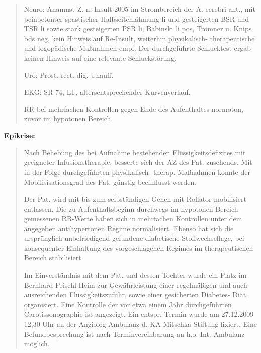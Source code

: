 {\begin{quote}
Neuro: Anamnst Z. n. Insult 2005 im Strombereich der A. cerebri ant., mit
beinbetonter spastischer Halbseitenlähmung li und gesteigerten
BSR und TSR li
sowie stark gesteigerten PSR li, Babinski li pos, Trömner u. Knips bds neg, kein Hinweis auf
Re-Insult, weiterhin physi\-ka\-lisch- thera\-peutische und logopädische
Maßnahmen empf. Der durchgeführte Schlucktest ergab keinen Hinweis auf eine relevante Schluckstörung.

Uro: Prost. rect. dig. Unauff.

EKG: SR 74, LT,
altersentsprechender Kurvenverlauf.

RR bei mehrfachen Kontrollen gegen Ende des Aufenthaltes normoton, zuvor im
hypotonen Bereich.
\end{quote}




{\bfseries Epikrise:}

\begin{quote}
  Nach Behebung des bei Aufnahme bestehenden Flüssigkeitsdefizites mit
  geeigneter Infusionstherapie, besserte sich der AZ des Pat. zusehends. Mit in der Folge
  durchgeführten physi\-ka\-lisch- therap. Maßnahmen konnte der
  Mobilisisationsgrad des Pat. günstig beeinflusst werden.
  
Der Pat. wird mit bis zum selbständigen Gehen mit Rollator mobilisiert entlassen.
Die zu Aufenthaltsbeginn durchwegs im hypotonen Bereich gemessenen RR-Werte haben
sich in mehrfachen Kontrollen unter dem angegeben antihypertonen Regime
normalisiert. Ebenso hat sich die ursprünglich unbefriedigend gefundene
diabetische Stoffwechsellage, bei konsequenter Einhaltung des vorgeschlagenen
Regimes im therapeutischen Bereich stabilisiert.

  Im Einverständnis mit dem Pat. und dessen Tochter wurde ein Platz im
  Bernhard-Prischl-Heim zur Gewährleistung einer regelmäßigen und auch
  ausreichenden Flüssigkeitszufuhr, sowie einer gesicherten Diabetes- Diät,
  organisiert. Eine Kontrolle der vor etwa einem Jahr durchgeführten 
  Carotissonographie ist angezeigt. Ein entspr. Termin wurde am
  27.12.2009  12,30 Uhr an der Angiolog Ambulanz d. KA Mitschka-Stiftung
  fixiert. Eine Befund\-be\-sprech\-ung ist nach Terminvereinbarung an h.o. Int.
  Ambulanz möglich.
\end{quote}

}
